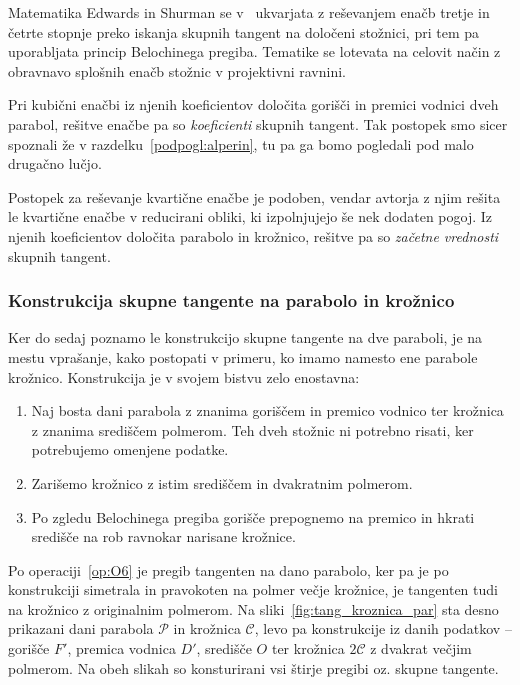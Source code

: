 Matematika Edwards in Shurman se v~\cite{edwards2001} ukvarjata z reševanjem enačb tretje in četrte stopnje preko iskanja skupnih tangent na določeni stožnici, pri tem pa uporabljata princip Belochinega pregiba. Tematike se lotevata na celovit način z obravnavo splošnih enačb stožnic v projektivni ravnini.

Pri kubični enačbi iz njenih koeficientov določita gorišči in premici vodnici dveh parabol, rešitve enačbe pa so \emph{koeficienti} skupnih tangent. Tak postopek smo sicer spoznali že v razdelku~\ref{podpogl:alperin}, tu pa ga bomo pogledali pod malo drugačno lučjo.

Postopek za reševanje kvartične enačbe je podoben, vendar avtorja z njim rešita le kvartične enačbe v reducirani obliki, ki izpolnjujejo še nek dodaten pogoj. Iz njenih koeficientov določita parabolo in krožnico, rešitve pa so \emph{začetne vrednosti} skupnih tangent.

\subsubsection*{Konstrukcija skupne tangente na parabolo in krožnico}

Ker do sedaj poznamo le konstrukcijo skupne tangente na dve paraboli, je na mestu vprašanje, kako postopati v primeru, ko imamo namesto ene parabole krožnico. Konstrukcija je v svojem bistvu zelo enostavna:
\begin{enumerate}
    \item Naj bosta dani parabola z znanima goriščem in premico vodnico ter krožnica z znanima središčem polmerom. Teh dveh stožnic ni potrebno risati, ker potrebujemo omenjene podatke.
    \item Zarišemo krožnico z istim središčem in dvakratnim polmerom.
    \item Po zgledu Belochinega pregiba gorišče prepognemo na premico in hkrati središče na rob ravnokar narisane krožnice.
\end{enumerate}

Po operaciji~\ref{op:O6} je pregib tangenten na dano parabolo, ker pa je po konstrukciji simetrala in pravokoten na polmer večje krožnice, je tangenten tudi na krožnico z originalnim polmerom. Na sliki~\ref{fig:tang_kroznica_par} sta desno prikazani dani parabola $\mathcal{P}$ in krožnica $\mathcal{C}$, levo pa konstrukcije iz danih podatkov -- gorišče $F'$, premica vodnica $D'$, središče $O$ ter krožnica $2\mathcal{C}$ z dvakrat večjim polmerom. Na obeh slikah so konsturirani vsi štirje pregibi oz. skupne tangente.

